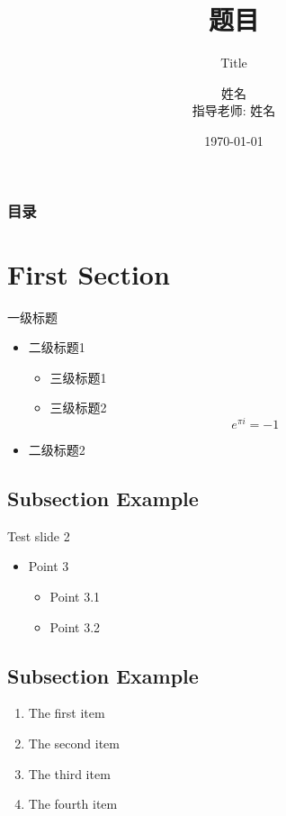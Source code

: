 \documentclass[12pt]{beamer}
\title{题目}
\subtitle{Title}
\author[Name]{
姓名 \\
指导老师: 姓名
}
\date{\today}
\institute[Zhejiang University]{
浙江大学 \\
\medskip
\textit{email@zju.edu.cn}
}
\begin{document}
\begin{frame}[plain]
	\titlepage
\end{frame}

\begin{frame}
\frametitle{目录}
\tableofcontents
\end{frame}

\section{First Section}

\begin{frame}{一级标题}
	\begin{itemize}
		\item 二级标题1
		\begin{itemize}
			\item 三级标题1
			\item 三级标题2
			\[e^{\pi i}=-1\]
		\end{itemize}
		\item 二级标题2
	\end{itemize}
\end{frame}

\subsection{Subsection Example}
\begin{frame}{Test slide 2}
	\begin{itemize}
		\item Point 3
		\begin{itemize}
			\item Point 3.1
			\item Point 3.2
		\end{itemize}
	\end{itemize}
\subsection{Subsection Example}
	\begin{enumerate}
		\item The first item
		\item The second item
		\item The third item
		\item The fourth item
	\end{enumerate}
\end{frame}
\end{document}
